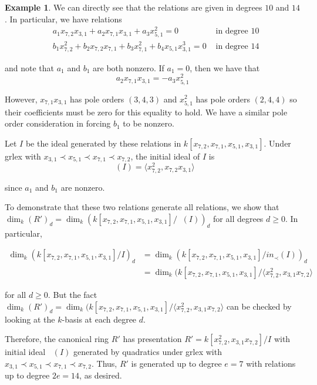 \documentclass{amsart}
\theoremstyle{plain}
\theoremstyle{definition}
\newtheorem{example}[thm]{Example}
\theoremstyle{remark}
\numberwithin{equation}{section}
\DeclareMathOperator{\initial}{in_\prec}
\begin{document}
\begin{example}

We can directly see that the relations are given in degrees $10$
and $14$. In particular, we have relations
\begin{align*}
	&a_1 x_{7, 2} x_{3, 1} + a_2 x_{7, 1} x_{3, 1} + a_3 x_{5, 1}^2 = 
	0 &\text{ in degree $10$} \\
	&b_1 x_{7, 2}^2 + b_2 x_{7, 2} x_{7, 1} + b_3 x_{7, 1}^2
	+ b_4 x_{5, 1} x_{3, 1}^3 = 0  &\text{ in degree $14$}
\end{align*}

\noindent
and note that $a_1$ and $b_1$ are both nonzero. If $a_1 = 0$, then we
have that
\[
	a_2 x_{7, 1} x_{3, 1} = -a_3 x_{5, 1}^2
\]

\noindent
However, $x_{7, 1} x_{3, 1}$ has pole orders $(3, 4, 3)$ and
$x_{5, 1}^2$ has pole orders $(2, 4, 4)$ so their
coefficients must be zero for this equality to hold. We have a
similar pole order consideration in forcing $b_1$ to be nonzero.

Let $I$ be the ideal generated by these relations in
$k[x_{7, 2}, x_{7, 1}, x_{5, 1}, x_{3, 1}]$. Under grlex with
$x_{3,1} \prec x_{5,1} \prec x_{7,1} \prec x_{7,2}$, the initial
ideal of $I$ is
\[
	\initial(I) = \langle x_{7, 2}^2, x_{7, 2} x_{3, 1} \rangle
\]

\noindent
since $a_1$ and $b_1$ are nonzero.

To demonstrate that these two relations generate all 
relations, we show that $\dim_k (R')_d = \dim_k
(k[x_{7, 2}, x_{7, 1}, x_{5, 1}, x_{3, 1}] / \initial(I))_d$ for 
all degrees $d \geq 0$. In particular, 

\begin{align*}
	\dim_k (k[x_{7, 2}, x_{7, 1}, x_{5, 1}, x_{3, 1}] / I)_d &=
	\dim_k (k[x_{7, 2}, x_{7, 1}, x_{5, 1}, x_{3, 1}]	/ in_\prec(I))_d \\
	&= \dim_k (k[x_{7, 2}, x_{7, 1}, x_{5, 1}, x_{3, 1}] / \langle
	x_{7, 2}^2, x_{3, 1} x_{7, 2} \rangle
\end{align*}

\noindent
for all $d \geq 0$. But the fact $\dim_k (R')_d = \dim_k (k[x_{7, 2},
x_{7, 1}, x_{5, 1}, x_{3, 1}] / \langle x_{7, 2}^2, x_{3, 1} x_{7, 2}
\rangle$ can be checked by looking at the $k$-basis at each degree
$d$.

Therefore, the canonical ring $R'$ has presentation $R' =
k[x_{7, 2}^2, x_{3, 1} x_{7, 2}] / I$ with
initial ideal $\initial(I)$ generated by quadratics under grlex
with $x_{3,1} \prec x_{5,1} \prec x_{7,1} \prec x_{7,2}$.
Thus, $R'$ is generated up to degree $e = 7$ with relations up to
degree $2e = 14$, as desired.

\end{example}
\end{document}
